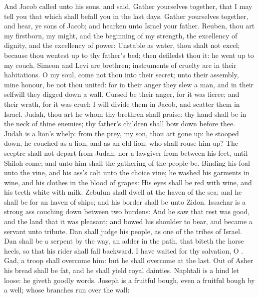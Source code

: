 \begin{biblechapter} %
 And Jacob called unto his sons, and said, Gather yourselves together, that I may tell you that which shall befall you in the last days.
\verse Gather yourselves together, and hear, ye sons of Jacob; and hearken unto Israel your father.
\verse Reuben, thou art my firstborn, my might, and the beginning of my strength, the excellency of dignity, and the excellency of power:
\verse Unstable as water, thou shalt not excel; because thou wentest up to thy father's bed; then defiledst thou it: he went up to my couch.
\verse Simeon and Levi are brethren; instruments of cruelty are in their habitations.
\verse O my soul, come not thou into their secret; unto their assembly, mine honour, be not thou united: for in their anger they slew a man, and in their selfwill they digged down a wall.
\verse Cursed be their anger, for it was fierce; and their wrath, for it was cruel: I will divide them in Jacob, and scatter them in Israel.
\verse Judah, thou art he whom thy brethren shall praise: thy hand shall be in the neck of thine enemies; thy father's children shall bow down before thee.
\verse Judah is a lion's whelp: from the prey, my son, thou art gone up: he stooped down, he couched as a lion, and as an old lion; who shall rouse him up?
\verse The sceptre shall not depart from Judah, nor a lawgiver from between his feet, until Shiloh come; and unto him shall the gathering of the people be.
\verse Binding his foal unto the vine, and his ass's colt unto the choice vine; he washed his garments in wine, and his clothes in the blood of grapes:
\verse His eyes shall be red with wine, and his teeth white with milk.
\verse Zebulun shall dwell at the haven of the sea; and he shall be for an haven of ships; and his border shall be unto Zidon.
\verse Issachar is a strong ass couching down between two burdens:
\verse And he saw that rest was good, and the land that it was pleasant; and bowed his shoulder to bear, and became a servant unto tribute.
\verse Dan shall judge his people, as one of the tribes of Israel.
\verse Dan shall be a serpent by the way, an adder in the path, that biteth the horse heels, so that his rider shall fall backward.
\verse I have waited for thy salvation, O \LORD.
\verse Gad, a troop shall overcome him: but he shall overcome at the last.
\verse Out of Asher his bread shall be fat, and he shall yield royal dainties.
\verse Naphtali is a hind let loose: he giveth goodly words.
\verse Joseph is a fruitful bough, even a fruitful bough by a well; whose branches run over the wall:

\end{biblechapter}

